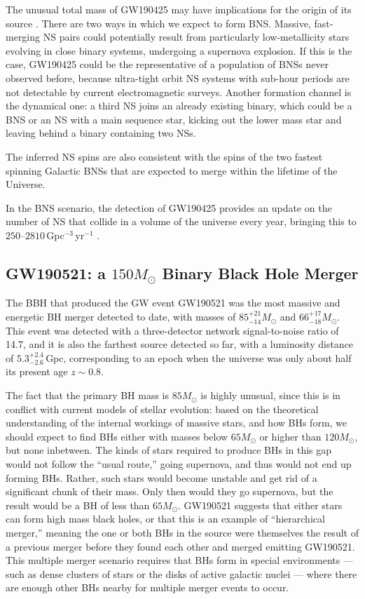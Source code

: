 \documentclass[binding=0.6cm, LaM]{sapthesis}
\begin{document}
	The unusual total mass of GW190425 may have implications for the origin of its source \cite{148}.
	There are two ways in which we expect to form BNS. 
	Massive, fast-merging NS pairs could potentially result from 
	particularly low-metallicity stars evolving in close binary systems, undergoing a supernova explosion.
	If this is the case, GW190425 could be the representative of a population of BNSs never observed before, 
	because ultra-tight orbit NS systems with sub-hour periods are not detectable by current electromagnetic surveys.
	Another formation channel is the dynamical one: a third NS joins an already existing binary, 
	which could be a BNS or an NS with a main sequence star, kicking out the
	lower mass star and leaving behind a binary containing two NSs.

	The inferred NS spins are also consistent with the spins of the two fastest 
	spinning Galactic BNSs that are expected to merge within the lifetime of the Universe.

	In the BNS scenario, the detection of GW190425 provides an update 
	on the number of NS that collide in a volume of the universe every year, bringing this to $250$--$2810\,$Gpc$^{-3}\,$yr$^{-1}$ \cite{62}.

\subsection{GW190521: a $150M_\odot$ Binary Black Hole Merger}
	The BBH that produced the GW event GW190521 was the most massive and energetic BH merger detected to date, 
	with masses of $85^{+21}_{-14}M_{\odot}$ and  $66^{+17}_{-18}M_{\odot}$.
	This event was detected with a three-detector network signal-to-noise ratio of 14.7, 
	and it is also the farthest source detected so far, with a luminosity distance of $5.3^{+2.4}_{-2.6}\,$Gpc,
	corresponding to an epoch when the universe was only about half its present age $z \sim 0.8$.

	The fact that the primary BH mass is $85 M_{\odot}$ is highly unusual, 
	since this is in conflict with current models of stellar evolution:
	based on the theoretical understanding of the internal workings of massive stars, 
	and how BHs form, we should expect to find BHs
	either with masses below $65M_\odot$ or higher than $120M_{\odot}$, but none inbetween.
	The kinds of stars required to produce BHs in this gap would not follow the ``usual route,''
	going supernova, and thus would not end up forming BHs. 
	Rather, such stars would become unstable and get rid of a significant chunk of their mass. 
	Only then would they go supernova, but the result would be a BH of less than $65 M_\odot$.
	GW190521 suggests that either stars can form high mass black holes, 
	or that this is an example of ``hierarchical merger,'' 
	meaning the one or both BHs in the source were themselves the result of 
	a previous merger before they found each other and merged emitting GW190521.
	This multiple merger scenario requires that BHs form in special environments
        --- such as dense clusters of stars or the disks of active galactic nuclei --- 
	where there are enough other BHs nearby for multiple merger events to occur.
\end{document}
